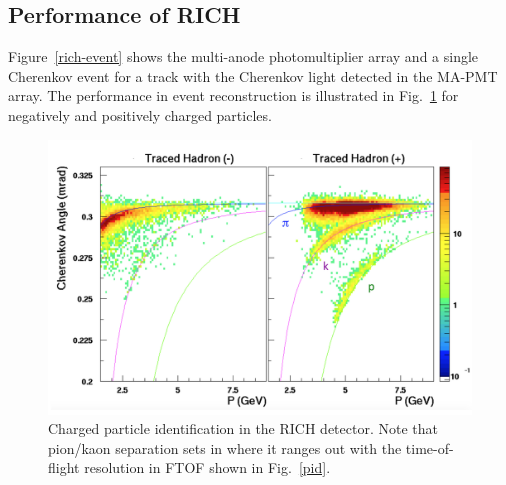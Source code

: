 \documentclass[final,3p,twocolumn]{elsarticle}
\begin{document}
\subsection{\rm Performance of RICH} 
 Figure~\ref{rich-event} shows the multi-anode photomultiplier array 
and a single Cherenkov event for a track with the Cherenkov light detected in the MA-PMT array.  The performance in event reconstruction is illustrated in Fig.~\ref{rich_rec} for negatively and positively charged particles. 
\begin{figure}[htbp!]
\centerline{\includegraphics[width=1.0\columnwidth]{RICH_rec.png}}
\caption{Charged particle identification in the RICH detector. Note that pion/kaon separation sets in where it ranges out with 
 the time-of-flight resolution in FTOF shown in Fig.~\ref{pid}.}
\label{rich_rec}
\end{figure}
\end{document}
